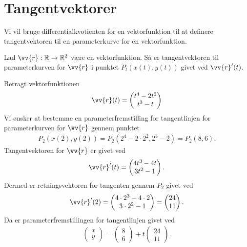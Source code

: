 \section*{Tangentvektorer}

Vi vil bruge differentialkvotienten for en vektorfunktion til at definere tangentvektoren til en parameterkurve for en vektorfunktion. 
\begin{defn}
	Lad $\vv{r}:\mathbb{R} \to \mathbb{R}^2$ være en vektorfunktion. Så er tangentvektoren til parameterkurven for $\vv{r}$ i punktet $P_t(x(t),y(t))$ givet ved $\vv{r}'(t)$. 
\end{defn}
\begin{exa}
	Betragt vektorfunktionen
	\begin{align*}
		\vv{r}(t) =
		\begin{pmatrix}
			t^4-2t^2 \\
			t^3-t
		\end{pmatrix}
	\end{align*}
	Vi ønsker at bestemme en parameterfremstilling for tangentlinjen for parameterkurven for $\vv{r}$ gennem punktet 
	\begin{align*}
		P_2(x(2),y(2)) = P_2(2^4-2\cdot 2^2,2^3-2) = P_2(8,6).
	\end{align*}
	Tangentvektoren for $\vv{r}$ er givet ved
	\begin{align*}
		\vv{r}'(t) =
		\begin{pmatrix}
			4t^3-4t \\
			3t^2-1
		\end{pmatrix}.
	\end{align*}
	Dermed er retningsvektoren for tangenten gennem $P_2$ givet ved
	\begin{align*}
		\vv{r}'(2) = 
		\begin{pmatrix}
			4\cdot 2^3 - 4\cdot 2 \\
			3\cdot 2^2-1
		\end{pmatrix}
		=
		\begin{pmatrix}
			24 \\
			11
		\end{pmatrix}.				
	\end{align*}
	Da er parameterfremstillingen for tangentlinjen givet ved
	\begin{align*}
		\begin{pmatrix}
			x \\
			y
		\end{pmatrix} =
		\begin{pmatrix}
			8 \\
			6
		\end{pmatrix} +
		t \begin{pmatrix}
			24 \\
			11
		\end{pmatrix}.
	\end{align*}
	

\end{exa}
